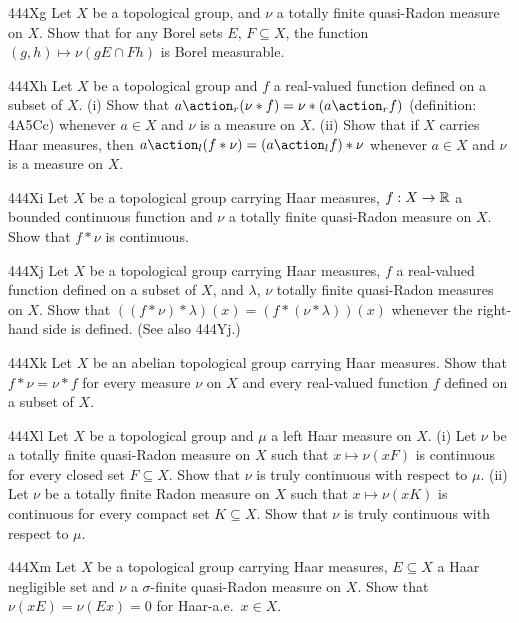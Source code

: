 {\spheader 444Xg Let $X$ be a topological group, and $\nu$ a totally
finite quasi-Radon measure on $X$.   Show that for any
Borel sets $E$, $F\subseteq X$, the function
$(g,h)\mapsto\nu(gE\cap Fh)$ is Borel measurable.   

\spheader 444Xh Let $X$ be a topological group and $f$ a real-valued
function defined on a subset of $X$.   (i) Show that
$a\action_r(\nu*f)=\nu*(a\action_rf)$ (definition:  4A5Cc) whenever
$a\in X$ and $\nu$ is a
measure on $X$.   (ii) Show that if $X$ carries Haar measures, then
$a\action_l(f*\nu)=(a\action_lf)*\nu$ whenever $a\in X$ and $\nu$ is a
measure on $X$.

\spheader 444Xi Let $X$ be a topological group carrying Haar measures,
$f:X\to\Bbb R$ a bounded continuous function and $\nu$ a totally finite
quasi-Radon measure on $X$.   Show that $f*\nu$ is continuous.

\spheader 444Xj Let $X$ be a topological group carrying Haar measures,
$f$ a real-valued function defined on a subset of $X$, and $\lambda$,
$\nu$ totally finite quasi-Radon measures on $X$.   Show that
$((f*\nu)*\lambda)(x)=(f*(\nu*\lambda))(x)$ whenever the right-hand side
is defined.   (See also 444Yj.)

\spheader 444Xk Let $X$ be an abelian topological group carrying Haar
measures.   Show that $f*\nu=\nu*f$ for every measure $\nu$ on $X$ and
every real-valued function $f$ defined on a subset of $X$.

\sqheader 444Xl Let $X$ be a topological group and $\mu$ a left Haar
measure on $X$.   (i) Let $\nu$ be a totally finite quasi-Radon measure
on $X$ such that $x\mapsto\nu(xF)$ is continuous for every closed set
$F\subseteq X$.   Show that $\nu$ is truly continuous with respect to
$\mu$.   
(ii) Let $\nu$ be a totally finite Radon measure on $X$ such that
$x\mapsto\nu(xK)$ is continuous for every compact set $K\subseteq X$.
Show that $\nu$ is truly continuous with respect to $\mu$.

\spheader 444Xm Let $X$ be a topological group carrying Haar measures,
$E\subseteq X$ a Haar negligible set and $\nu$ a $\sigma$-finite
quasi-Radon measure on $X$.   Show that $\nu(xE)=\nu(Ex)=0$ for
Haar-a.e.\ $x\in X$.

}
